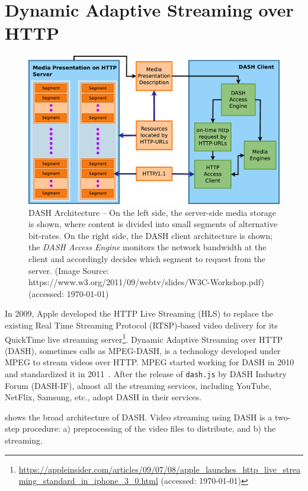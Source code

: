 \section{Dynamic Adaptive Streaming over HTTP}
\begin{figure}[!t]
	\centering
	\includegraphics[scale=0.25]{img/dash-arch}
	\caption{\small{DASH Architecture -- On the left side, the server-side media storage is shown, where content is divided into small segments of alternative bit-rates. On the right side, the DASH client architecture is shown; the {\it DASH Access Engine} monitors the network bandwidth at the client and accordingly decides which segment to request from the server. (Image Source: https://www.w3.org/2011/09/webtv/slides/W3C-Workshop.pdf) (accessed: \today)}}
	\label{fig:dash}
\end{figure}
In 2009, Apple developed the HTTP Live Streaming (HLS) to replace the existing Real Time Streaming Protocol (RTSP)-based video delivery for its QuickTime live streaming server\footnote{\url{https://appleinsider.com/articles/09/07/08/apple_launches_http_live_streaming_standard_in_iphone_3_0.html} (accessed: \today)}. Dynamic Adaptive Streaming over HTTP (DASH), sometimes calls as MPEG-DASH, is a technology developed under MPEG to stream videos over HTTP. MPEG started working for DASH in 2010 and standardized it in 2011~\cite{ISO/IEC23009-1:2019}. After the release of {\tt dash.js} by DASH Industry Forum (DASH-IF), almost all the streaming services, including YouTube, NetFlix, Samsung, etc., adopt DASH in their services.

\fig{\ref{fig:dash}} shows the broad architecture of DASH. Video streaming using DASH is a two-step procedure: a) preprocessing of the video files to distribute, and b) the streaming. 


